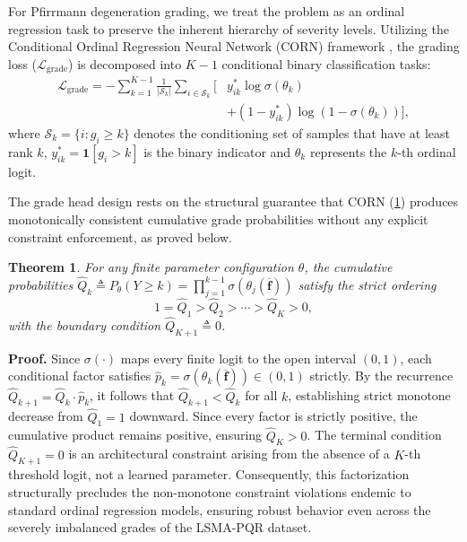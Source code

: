 \documentclass[journal]{IEEEtran}
\newtheorem{theorem}{Theorem}[section]
\begin{document}
For Pfirrmann degeneration grading, we treat the problem as an ordinal regression task to preserve the inherent hierarchy of severity levels. Utilizing the Conditional Ordinal Regression Neural Network (CORN) framework \cite{shi2022corn}, the grading loss ($\mathcal{L}_\text{grade}$) is decomposed into $K{-}1$ conditional binary classification tasks:
\begin{equation}
\begin{split}
    \mathcal{L}_\text{grade} = -\sum_{k=1}^{K-1} \frac{1}{|\mathcal{S}_k|}\sum_{i \in \mathcal{S}_k} \bigl[&y_{ik}^* \log \sigma(\theta_k) \\
    &+ (1 {-} y_{ik}^*) \log (1 {-} \sigma(\theta_k))\bigr],
\end{split}
    \label{eq:corn_loss}
\end{equation}
where $\mathcal{S}_k = \{i : g_i \geq k\}$ denotes the conditioning set of samples that have at least rank $k$, $y_{ik}^* = \mathbf{1}[g_i > k]$ is the binary indicator and $\theta_k$ represents the $k$-th ordinal logit.


The grade head design rests on the structural guarantee that CORN (\cref{thm:corn}) produces monotonically consistent cumulative grade probabilities without any explicit constraint enforcement, as proved below.

\begin{theorem}
\label{thm:corn}
For any finite parameter configuration $\theta$, the cumulative probabilities $\hat{Q}_k \triangleq P_\theta(Y \geq k) = \prod_{j=1}^{k-1}\sigma\!\left(\theta_j(\overline{\mathbf{f}})\right)$ satisfy the strict ordering
\[
1 = \hat{Q}_1 > \hat{Q}_2 > \cdots > \hat{Q}_{K} > 0,
\]
with the boundary condition $\hat{Q}_{K+1} \triangleq 0$.
\end{theorem}

\textbf{Proof.}
Since $\sigma(\cdot)$ maps every finite logit to the open interval $(0,1)$, each conditional factor satisfies $\hat{p}_k = \sigma(\theta_k(\overline{\mathbf{f}})) \in (0,1)$ strictly. By the recurrence $\hat{Q}_{k+1} = \hat{Q}_k \cdot \hat{p}_k$, it follows that $\hat{Q}_{k+1} < \hat{Q}_k$ for all $k$, establishing strict monotone decrease from $\hat{Q}_1 = 1$ downward. Since every factor is strictly positive, the cumulative product remains positive, ensuring $\hat{Q}_K > 0$. The terminal condition $\hat{Q}_{K+1} = 0$ is an architectural constraint arising from the absence of a $K$-th threshold logit, not a learned parameter. Consequently, this factorization structurally precludes the non-monotone constraint violations endemic to standard ordinal regression models, ensuring robust behavior even across the severely imbalanced grades of the LSMA-PQR dataset.
\end{document}

